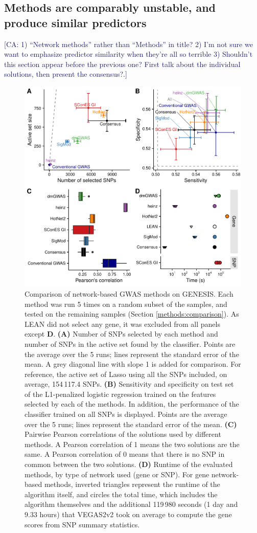 \documentclass[twocolumn, 11pt]{article}
\newcommand{\cazcom}[2]{{\uline{#1}}\unskip\space\textcolor{MidnightBlue}{[CA: #2]}}
\begin{document}
\subsection{Methods are comparably unstable, and produce similar predictors}
\cazcom{}{1) ``Network methods'' rather than ``Methods'' in title? 2) I'm not sure we want to emphasize predictor similarity when they're all so terrible 3) Shouldn't this section appear before the previous one? First talk about the individual solutions, then present the consensus?.}

\begin{figure}[htbp]
\centering
\includegraphics[width=.72\linewidth]{./figures/figure_4.pdf}
\caption{\label{fig:benchmark}
Comparison of network-based GWAS methods on GENESIS. Each method was run 5 times on a random subset of the samples, and tested on the remaining samples (Section \ref{methods:comparison}). As LEAN did not select any gene, it was excluded from all panels except \textbf{D}. \textbf{(A)} Number of SNPs selected by each method and number of SNPs in the active set found by the classifier. Points are the average over the 5 runs; lines represent the standard error of the mean. A grey diagonal line with slope 1 is added for comparison. For reference, the active set of Lasso using all the SNPs included, on average, 154\,117.4 SNPs. \textbf{(B)} Sensitivity and specificity on test set of the L1-penalized logistic regression trained on the features selected by each of the methods. In addition, the performance of the classifier trained on all SNPs is displayed. Points are the average over the 5 runs; lines represent the standard error of the mean. \textbf{(C)} Pairwise Pearson correlations of the solutions used by different methods. A Pearson correlation of 1 means the two solutions are the same. A Pearson correlation of 0 means that there is no SNP in common between the two solutions. \textbf{(D)} Runtime of the evaluated methods, by type of network used (gene or SNP). For gene network-based methods, inverted triangles represent the runtime of the algorithm itself, and circles the total time, which includes the algorithm themselves and the additional 119\,980 seconds (1 day and 9.33 hours) that VEGAS2v2 took on average to compute the gene scores from SNP summary statistics.}
\end{figure}
\end{document}
